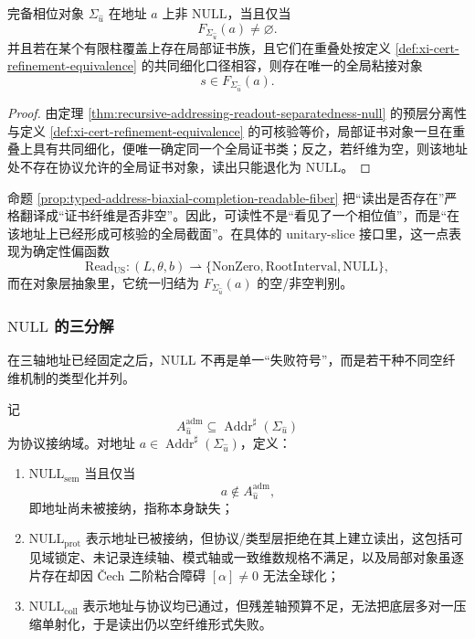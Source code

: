 \begin{proposition}[可读性的对象论判据]\label{prop:typed-address-biaxial-completion-readable-fiber}
完备相位对象 \(\Sigma_{\hat u}\) 在地址 \(a\) 上非 \(\mathrm{NULL}\)，当且仅当
\[
F_{\Sigma_{\hat u}}(a)\neq \varnothing.
\]
并且若在某个有限柱覆盖上存在局部证书族，且它们在重叠处按定义 \ref{def:xi-cert-refinement-equivalence} 的共同细化口径相容，则存在唯一的全局粘接对象
\[
s\in F_{\Sigma_{\hat u}}(a).
\]
\end{proposition}
\begin{proof}
由定理 \ref{thm:recursive-addressing-readout-separatedness-null} 的预层分离性与定义 \ref{def:xi-cert-refinement-equivalence} 的可核验等价，局部证书对象一旦在重叠上具有共同细化，便唯一确定同一个全局证书类；反之，若纤维为空，则该地址处不存在协议允许的全局证书对象，读出只能退化为 \(\mathrm{NULL}\)。
\end{proof}

命题 \ref{prop:typed-address-biaxial-completion-readable-fiber} 把“读出是否存在”严格翻译成“证书纤维是否非空”。因此，可读性不是“看见了一个相位值”，而是“在该地址上已经形成可核验的全局截面”。在具体的 unitary-slice 接口里，这一点表现为确定性偏函数
\[
\mathrm{Read}_{\mathrm{US}}:(L,\theta,b)\rightharpoonup
\{\mathrm{NonZero},\mathrm{RootInterval},\mathrm{NULL}\},
\]
而在对象层抽象里，它统一归结为 \(F_{\Sigma_{\hat u}}(a)\) 的空/非空判别。

\subsubsection{\texorpdfstring{$\mathrm{NULL}$}{NULL} 的三分解}\label{subsubsec:typed-address-biaxial-completion-null-trichotomy}
在三轴地址已经固定之后，\(\mathrm{NULL}\) 不再是单一“失败符号”，而是若干种不同空纤维机制的类型化并列。

\begin{definition}\label{def:typed-address-biaxial-completion-null-trichotomy}
记
\[
A^{\mathrm{adm}}_{\hat u}\subseteq \operatorname{Addr}^{\sharp}(\Sigma_{\hat u})
\]
为协议接纳域。对地址 \(a\in \operatorname{Addr}^{\sharp}(\Sigma_{\hat u})\)，定义：
\begin{enumerate}
  \item \(\mathrm{NULL}_{\mathrm{sem}}\) 当且仅当
  \[
  a\notin A^{\mathrm{adm}}_{\hat u},
  \]
  即地址尚未被接纳，指称本身缺失；
  \item \(\mathrm{NULL}_{\mathrm{prot}}\) 表示地址已被接纳，但协议/类型层拒绝在其上建立读出，这包括可见域锁定、未记录连续轴、模式轴或一致维数规格不满足，以及局部对象虽逐片存在却因 Čech 二阶粘合障碍 \([\alpha]\neq 0\) 无法全球化；
  \item \(\mathrm{NULL}_{\mathrm{coll}}\) 表示地址与协议均已通过，但残差轴预算不足，无法把底层多对一压缩单射化，于是读出仍以空纤维形式失败。
\end{enumerate}
\end{definition}


